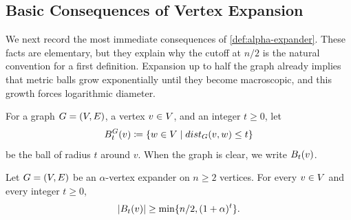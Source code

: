 \subsection{Basic Consequences of Vertex Expansion}
\label{subsec:basic-alpha-expander-properties}

We next record the most immediate consequences of \cref{def:alpha-expander}. These facts are elementary, but they explain why the cutoff at \(n/2\) is the natural convention for a first definition. Expansion up to half the graph already implies that metric balls grow exponentially until they become macroscopic, and this growth forces logarithmic diameter.

For a graph \(G=(V,E)\), a vertex \(v\in V\), and an integer \(t\geq 0\), let
\begin{equation}
	\label{eq:ball-definition}
	B_t^{G}(v)\coloneqq \{w\in V\mid dist_{G}(v,w)\leq t\}
\end{equation}
be the ball of radius \(t\) around \(v\). When the graph is clear, we write \(B_t(v)\).

\begin{proposition}
	\label{prop:ball-growth}
	Let \(G=(V,E)\) be an \(\alpha\)-vertex expander on \(n\geq 2\) vertices. For every \(v\in V\) and every integer \(t\geq 0\),
	\begin{equation}
		\label{eq:ball-growth-bound}
		\lvert B_t(v)\rvert\geq \min\{n/2,(1+\alpha)^t\}.
	\end{equation}
\end{proposition}

